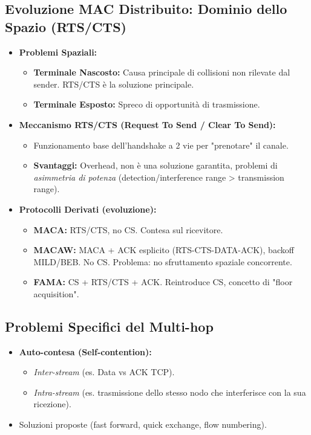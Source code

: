 \subsection{Evoluzione MAC Distribuito: Dominio dello Spazio (RTS/CTS)}
\begin{itemize}
    \item \textbf{Problemi Spaziali:}
    \begin{itemize}
        \item \textbf{Terminale Nascosto:} Causa principale di collisioni non rilevate dal sender. RTS/CTS è la soluzione principale.
        \item \textbf{Terminale Esposto:} Spreco di opportunità di trasmissione.
    \end{itemize}
    \item \textbf{Meccanismo RTS/CTS (Request To Send / Clear To Send):}
    \begin{itemize}
        \item Funzionamento base dell'handshake a 2 vie per "prenotare" il canale.
        \item \textbf{Svantaggi:} Overhead, non è una soluzione garantita, problemi di \textit{asimmetria di potenza} (detection/interference range > transmission range).
    \end{itemize}
    \item \textbf{Protocolli Derivati (evoluzione):}
    \begin{itemize}
        \item \textbf{MACA:} RTS/CTS, no CS. Contesa sul ricevitore.
        \item \textbf{MACAW:} MACA + ACK esplicito (RTS-CTS-DATA-ACK), backoff MILD/BEB. No CS. Problema: no sfruttamento spaziale concorrente.
        \item \textbf{FAMA:} CS + RTS/CTS + ACK. Reintroduce CS, concetto di "floor acquisition".
    \end{itemize}
\end{itemize}

\subsection{Problemi Specifici del Multi-hop}
\begin{itemize}
    \item \textbf{Auto-contesa (Self-contention):}
    \begin{itemize}
        \item \textit{Inter-stream} (es. Data vs ACK TCP).
        \item \textit{Intra-stream} (es. trasmissione dello stesso nodo che interferisce con la sua ricezione).
    \end{itemize}
    \item Soluzioni proposte (fast forward, quick exchange, flow numbering).
\end{itemize}


